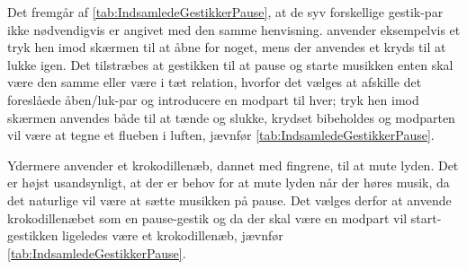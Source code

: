 \noindent
%
Det fremgår af \autoref{tab:IndsamledeGestikkerPause}, at de syv forskellige gestik-par ikke nødvendigvis er angivet med den samme henvisning. \textcite[s. 48]{PDF:UserDefinedGesturesTV} anvender eksempelvis et tryk hen imod skærmen til at åbne for noget, mens der anvendes et kryds til at lukke igen. Det tilstræbes at gestikken til at pause og starte musikken enten skal være den samme eller være i tæt relation, hvorfor det vælges at afskille det foreslåede åben/luk-par og introducere en modpart til hver; tryk hen imod skærmen anvendes både til at tænde og slukke, krydset bibeholdes og modparten vil være at tegne et flueben i luften, jævnfør \autoref{tab:IndsamledeGestikkerPause}.   

Ydermere anvender \textcite[s. 48]{PDF:UserDefinedGesturesTV} et krokodillenæb, dannet med fingrene, til at mute lyden. Det er højst usandsynligt, at der er behov for at mute lyden når der høres musik, da det naturlige vil være at sætte musikken på pause. Det vælges derfor at anvende krokodillenæbet som en pause-gestik og da der skal være en modpart vil start-gestikken ligeledes være et krokodillenæb, jævnfør \autoref{tab:IndsamledeGestikkerPause}. 
%

